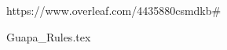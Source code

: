 \documentclass[letter,10pt]{article}
\begin{document}

\newpage

https://www.overleaf.com/4435880csmdkb\#
\newpage


\newpage

\newpage

\newpage

\newpage

\newpage
 {Guapa_Rules.tex}
\end{document}
